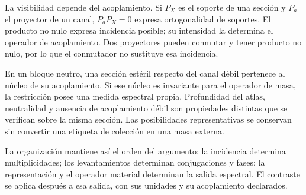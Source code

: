 La visibilidad depende del acoplamiento. Si $P_X$ es el soporte de
una sección y $P_a$ el proyector de un canal, $P_aP_X=0$ expresa
ortogonalidad de soportes. El producto no nulo expresa incidencia
posible; su intensidad la determina el operador de acoplamiento.
Dos proyectores pueden conmutar y tener producto no nulo, por lo
que el conmutador no sustituye esa incidencia.

En un bloque neutro, una sección estéril respecto del canal débil
pertenece al núcleo de su acoplamiento. Si ese núcleo es invariante
para el operador de masa, la restricción posee una medida espectral
propia. Profundidad del atlas, neutralidad y ausencia de acoplamiento
débil son propiedades distintas que se verifican sobre la misma
sección. Las posibilidades representativas se conservan sin
convertir una etiqueta de colección en una masa externa.

La organización mantiene así el orden del argumento: la incidencia
determina multiplicidades; los levantamientos determinan
conjugaciones y fases; la representación y el operador material
determinan la salida espectral. El contraste se aplica después a
esa salida, con sus unidades y su acoplamiento declarados.
